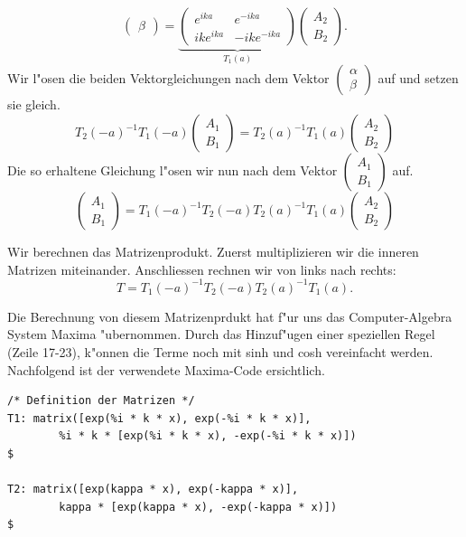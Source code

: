 \begin{refsection}
\[\begin{pmatrix}
\beta
\end{pmatrix}
 = 
\underbrace{
\begin{pmatrix}
e^{ika}
&
e^{-ika}
\\
ike^{ika}
&
-ike^{-ika}
\end{pmatrix}
}_{T_1(a)}
\begin{pmatrix}
A_2
\\
B_2
\end{pmatrix}.
\]
Wir l"osen die beiden Vektorgleichungen nach dem Vektor
$
\begin{pmatrix}
\alpha
\\
\beta
\end{pmatrix}
$
auf und setzen sie gleich.
\[
T_2(-a)^{-1}T_1(-a)
\begin{pmatrix}
A_1
\\
B_1
\end{pmatrix}
=
T_2(a)^{-1}T_1(a)
\begin{pmatrix}
A_2
\\
B_2
\end{pmatrix}
\]
Die so erhaltene Gleichung l"osen wir nun nach dem Vektor
$
\begin{pmatrix}
A_1
\\
B_1
\end{pmatrix}
$
auf.
\[
\begin{pmatrix}
A_1
\\
B_1
\end{pmatrix}
=
T_1(-a)^{-1}T_2(-a)T_2(a)^{-1}T_1(a)
\begin{pmatrix}
A_2
\\
B_2
\end{pmatrix}
\]

Wir berechnen das Matrizenprodukt. 
Zuerst multiplizieren wir die inneren Matrizen miteinander. 
Anschliessen rechnen wir von links nach rechts:
\[
T = T_1(-a)^{-1}T_2(-a)T_2(a)^{-1}T_1(a).
\]

Die Berechnung von diesem Matrizenprdukt hat f"ur uns das Computer-Algebra System Maxima "ubernommen. 
%
Durch das Hinzuf"ugen einer speziellen Regel (Zeile 17-23), k"onnen die Terme noch mit sinh und cosh vereinfacht werden.
Nachfolgend ist der verwendete Maxima-Code ersichtlich.

\begin{lstlisting}[style=Maxima]
/* Definition der Matrizen */
T1: matrix([exp(%i * k * x), exp(-%i * k * x)],
        %i * k * [exp(%i * k * x), -exp(-%i * k * x)])                      $

T2: matrix([exp(kappa * x), exp(-kappa * x)],
        kappa * [exp(kappa * x), -exp(-kappa * x)])                         $


\end{lstlisting}
\end{refsection}
